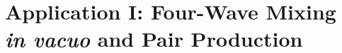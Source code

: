 \documentclass[11pt,SymmetricalJury]{inrsthesis/inrsthesis}
\begin{document}

\chapter{Application I: Four-Wave Mixing \textit{in vacuo} and Pair Production}
\end{document}
